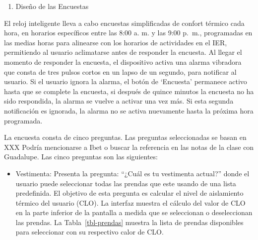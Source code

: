 \documentclass[
  letterpaper,
  DIV=11,
  numbers=noendperiod]{scrreport}
\providecommand{\tightlist}{%
  \setlength{\itemsep}{0pt}\setlength{\parskip}{0pt}}\usepackage{longtable,booktabs,array}
\begin{document}
\begin{enumerate}
\def\labelenumi{\arabic{enumi}.}
\tightlist
\item
  Diseño de las Encuestas
\end{enumerate}

El reloj inteligente lleva a cabo encuestas simplificadas de confort
térmico cada hora, en horarios específicos entre las 8:00 a. m. y las
9:00 p.~m., programadas en las medias horas para alinearse con los
horarios de actividades en el IER, permitiendo al usuario aclimatarse
antes de responder la encuesta. Al llegar el momento de responder la
encuesta, el dispositivo activa una alarma vibradora que consta de tres
pulsos cortos en un lapso de un segundo, para notificar al usuario. Si
el usuario ignora la alarma, el botón de `Encuesta' permanece activo
hasta que se complete la encuesta, si después de quince minutos la
encuesta no ha sido respondida, la alarma se vuelve a activar una vez
más. Si esta segunda notificación es ignorada, la alarma no se activa
nuevamente hasta la próxima hora programada.

La encuesta consta de cinco preguntas. Las preguntas seleccionadas se
basan en XXX Podría mencionarse a Ibet o buscar la referencia en las
notas de la clase con Guadalupe. Las cinco preguntas son las siguientes:

\begin{itemize}
\tightlist
\item
  Vestimenta: Presenta la pregunta: ``¿Cuál es tu vestimenta actual?''
  donde el usuario puede seleccionar todas las prendas que este usando
  de una lista predefinida. El objetivo de esta pregunta es calcular el
  nivel de aislamiento térmico del usuario (CLO). La interfaz muestra el
  cálculo del valor de CLO en la parte inferior de la pantalla a medida
  que se seleccionan o deseleccionan las prendas. La
  Tabla~\ref{tbl-prendas} muestra la lista de prendas disponibles para
  seleccionar con su respectivo calor de CLO.
\end{itemize}
\end{document}
